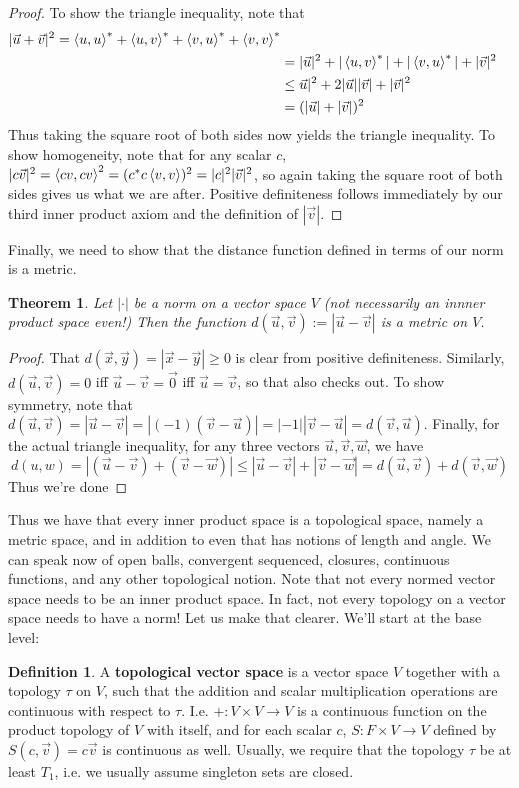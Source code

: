\documentclass{article}
\theoremstyle{definition}
\newtheorem{definition}{Definition}[section]
\theoremstyle{plain}
\theoremstyle{theorem}
\newtheorem{theorem}{Theorem}[section]
\begin{document}
\begin{proof}
	To show the triangle inequality, note that 
	\begin{align*}
		|\vec{u}+\vec{v}|^2 = \braket{u,u}^*+\braket{u,v}^*+\braket{v,u}^*+\braket{v,v}^* \\
		&= |\vec{u}|^2 +|\braket{u,v}^*|+|\braket{v,u}^*|+|\vec{v}|^2 \\
		&\leq \vec{u}|^2+2|\vec{u}||\vec{v}|+|\vec{v}|^2 \\
		&= (|\vec{u}|+|\vec{v}|)^2
	\end{align*}
	Thus taking the square root of both sides now yields the triangle inequality. To show homogeneity, note that for any scalar $c$, $|c\vec{v}|^2 = \braket{cv,cv}^2 = (c^*c\braket{v,v})^2 = |c|^2|\vec{v}|^2$, so again taking the square root of both sides gives us what we are after. Positive definiteness follows immediately by our third inner product axiom and the definition of $|\vec{v}|$. 
\end{proof}
Finally, we need to show that the distance function defined in terms of our norm is a metric.
\begin{theorem}
	Let $|\cdot|$ be a norm on a vector space $V$ (not necessarily an innner product space even!) Then the function $d(\vec{u},\vec{v}) := |\vec{u} - \vec{v}|$ is a metric on $V$. 
\end{theorem}
\begin{proof}
	That $d(\vec{x},\vec{y}) = |\vec{x} - \vec{y}| \geq 0$ is clear from positive definiteness. Similarly, $d(\vec{u},\vec{v}) = 0$ iff $\vec{u}-\vec{v}=\vec{0}$ iff $\vec{u} = \vec{v}$, so that also checks out. To show symmetry, note that $d(\vec{u},\vec{v}) = |\vec{u}-\vec{v}| = |(-1)(\vec{v}-\vec{u})| = |-1||\vec{v} - \vec{u}| = d(\vec{v},\vec{u})$. Finally, for the actual triangle inequality, for any three vectors $\vec{u},\vec{v},\vec{w}$, we have 
	\[ d(u,w) = |(\vec{u}-\vec{v})+(\vec{v}-\vec{w})| \leq |\vec{u}-\vec{v}|+|\vec{v}-\vec{w}| = d(\vec{u},\vec{v})+d(\vec{v},\vec{w}) \]
Thus we're done
\end{proof}
Thus we have that every inner product space is a topological space, namely a metric space, and in addition to even that has notions of length and angle. We can speak now of open balls, convergent sequenced, closures, continuous functions, and any other topological notion. Note that not every normed vector space needs to be an inner product space. In fact, not every topology on a vector space needs to have a norm! 
Let us make that clearer. We'll start at the base level:
\begin{definition}
	A \textbf{topological vector space} is a vector space $V$ together with a topology $\tau$ on $V$, such that the addition and scalar multiplication operations are continuous with respect to $\tau$. I.e. $+:V \times V \to V$ is a continuous function on the product topology of $V$ with itself, and for each scalar $c$, $S:F \times V \to V$ defined by $S(c,\vec{v}) = c\vec{v}$ is continuous as well. Usually, we require that the topology $\tau$ be at least $T_1$, i.e. we usually assume singleton sets are closed.
\end{definition}
\end{document}
